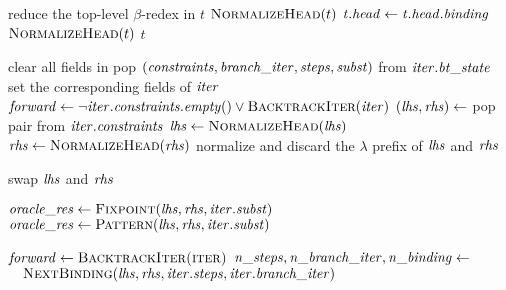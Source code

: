 \begin{algorithmic}[]
      \State reduce the top-level $\beta$-redex in $t$
      \State \Return $\textsc{NormalizeHead}(t)$
      \State $\mathit{t.head} \gets \mathit{t.head.binding}$
      \State \Return $\textsc{NormalizeHead}(t)$
    \Else{}
      \State \Return $t$
    \EndIf
  \EndFunction
  
  \vspace{\jot}
      \State clear all fields in 
      \State \Return {}
    \Else
    \State pop $(\mathit{constraints}, \mathit{branch\_iter}, \mathit{steps}, \mathit{subst})$ from $\mathit{iter.bt\_state}$
    \State set the corresponding fields of $\mathit{iter}$
    \State \Return {}
    \EndIf
  \EndFunction
  \vspace{\jot}
  \State $\mathit{forward} \gets \neg \mathit{iter.constraints.empty()} \lor \textsc{BacktrackIter}(\mathit{iter})$
    \State $(\mathit{lhs}, \mathit{rhs}) \gets $ pop pair from $\mathit{iter.constraints}$
    \State $\mathit{lhs} \gets \textsc{NormalizeHead}(\mathit{lhs})$
    \State $\mathit{rhs} \gets \textsc{NormalizeHead}(\mathit{rhs})$
    \State normalize and discard the $\lambda$ prefix of $\mathit{lhs}$ and $\mathit{rhs}$

      \State swap $\mathit{lhs}$ and $\mathit{rhs}$
    \EndIf

      \State $\mathit{oracle\_res} \gets \textsc{Fixpoint}(\mathit{lhs, rhs, iter.subst}) $
        \State $\mathit{oracle\_res} \gets \textsc{Pattern}(\mathit{lhs, rhs, iter.subst}) $
      \EndIf

        \State $\mathit{forward} \gets \textsc{BacktrackIter(iter)}$
        \State $\mathit{n\_steps}, \mathit{n\_branch\_iter}, \mathit{n\_binding} \gets$
        \State $\quad \textsc{NextBinding}(\mathit{lhs}, \mathit{rhs}, \mathit{iter.steps}, \mathit{iter.branch\_iter})$
        

\end{algorithmic}
